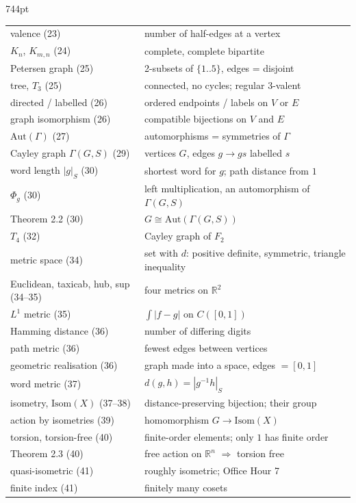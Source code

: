 \documentclass[10pt]{article}
\newcommand{\R}{\mathbb{R}}
\newcommand{\inv}{^{-1}}
\begin{document}
\begin{textblock*}{744pt}
\begin{minipage}[t]{330pt}
\begin{tabular}{@{}p{100pt}p{225pt}@{}}
valence (23) & number of half-edges at a vertex\\
$K_n$, $K_{m,n}$ (24) & complete, complete bipartite\\
Petersen graph (25) & 2-subsets of $\{1..5\}$, edges = disjoint\\
tree, $T_3$ (25) & connected, no cycles; regular 3-valent\\
directed / labelled (26) & ordered endpoints / labels on $V$ or $E$\\
graph isomorphism (26) & compatible bijections on $V$ and $E$\\
$\mathrm{Aut}(\Gamma)$ (27) & automorphisms = symmetries of $\Gamma$\\
Cayley graph $\Gamma(G,S)$ (29) & vertices $G$, edges $g\to gs$ labelled $s$\\
word length $|g|_S$ (30) & shortest word for $g$; path distance from $1$\\
$\Phi_g$ (30) & left multiplication, an automorphism of $\Gamma(G,S)$\\
Theorem 2.2 (30) & $G\cong\mathrm{Aut}(\Gamma(G,S))$\\
$T_4$ (32) & Cayley graph of $F_2$\\
metric space (34) & set with $d$: positive definite, symmetric, triangle inequality\\
Euclidean, taxicab, hub, sup (34--35) & four metrics on $\R^2$\\
$L^1$ metric (35) & $\int|f-g|$ on $C([0,1])$\\
Hamming distance (36) & number of differing digits\\
path metric (36) & fewest edges between vertices\\
geometric realisation (36) & graph made into a space, edges $=[0,1]$\\
word metric (37) & $d(g,h)=|g\inv h|_S$\\
isometry, $\mathrm{Isom}(X)$ (37--38) & distance-preserving bijection; their group\\
action by isometries (39) & homomorphism $G\to\mathrm{Isom}(X)$\\
torsion, torsion-free (40) & finite-order elements; only $1$ has finite order\\
Theorem 2.3 (40) & free action on $\R^n$ $\Rightarrow$ torsion free\\
quasi-isometric (41) & roughly isometric; Office Hour 7\\
finite index (41) & finitely many cosets\\
\end{tabular}
\end{minipage}
\end{textblock*}
\mbox{}\clearpage
\end{document}
